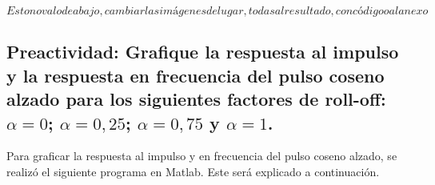 \documentclass[lettersize,journal]{IEEEtran}
\begin{document}
$ Esto no va lo de abajo, cambiar las imágenes de lugar, todas al resultado, con código o al anexo $

\subsection{Preactividad: Grafique la respuesta al impulso y la respuesta en
frecuencia del pulso coseno alzado para los siguientes
factores de roll-off: $\alpha = 0$; $\alpha = 0,25$; $\alpha = 0,75$  y $\alpha = 1$.}

\vspace{2mm}

Para graficar la respuesta al impulso y en frecuencia del pulso coseno alzado, se realizó el siguiente programa en Matlab. Este será explicado a continuación.

\vspace{2mm}


\vspace{2mm}


\vspace{2mm}

\\
\end{document}
